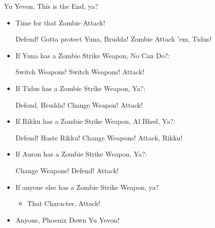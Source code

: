 \begin{battle}[99999]{Yu Yevon, This is the End, ya?}
\begin{itemize}
\item Time for that Zombie Attack!
\begin{itemize}
\yunaf Defend! Gotta protect Yuna, Brudda!
\tidusf Zombie Attack 'em, Tidus!
\end{itemize}
\item If Yuna has a Zombie Strike Weapon, No Can Do?:
\begin{itemize}
\yunaf Switch Weapons!
\tidusf Switch Weapons!
\yunaf Attack!
\end{itemize}
\item If Tidus has a Zombie Strike Weapon, Ya?:
\begin{itemize}
\yunaf Defend, Brudda!
\tidusf Change Weapon!
\tidusf Attack!
\end{itemize}
\item If Rikku has a Zombie Strike Weapon, Al Bhed, Ya?:
\begin{itemize}
\yunaf Defend!
\tidusf Haste Rikku!
\yunaf Change Weapons!
\rikkuf Attack, Rikku!
\end{itemize}
\item If Auron has a Zombie Strike Weapon, Ya?:
\begin{itemize}
\switch{\yuna}{\auron}
\auronf Change Weapons!
\tidusf Defend!
\auronf Attack!
\end{itemize}
\item If anyone else has a Zombie Strike Weapon, ya?
\begin{itemize}
\item That Character, Attack!
\end{itemize}
\item Anyone, Phoenix Down Yu Yevon!
\end{itemize}
\end{battle}
\colstart